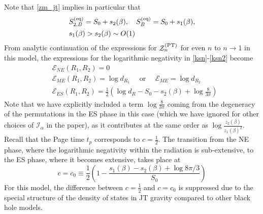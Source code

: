 \documentclass[a4paper,11pt]{article}
\newcommand\half{{\ensuremath{\frac{1}{2}}}}
\newcommand{\be}{\begin{equation}}
\newcommand{\ee}{\end{equation}}
\newcommand{\bea}{\begin{eqnarray}}
\newcommand{\eea}{\end{eqnarray}}
\newcommand\al{{\alpha}}
\def\b{{\beta}}
\newcommand\ha{{\half}}
\newcommand\sE{{\ensuremath{{\mathcal E}}}}
\newcommand\sI{{\ensuremath{{\mathcal I}}}}
\newcommand\sZ{{\mathcal Z}}
\begin{document}
\begin{enumerate}
\begin{appendix}
Note that \eqref{zm_jt} implies in particular that 
\bea 
& S_{2, B}^{(\rm eq)} = S_0 + s_2 (\b) , \quad S_{B}^{(\rm eq)} = S_0 + s_1 (\b) , \nonumber \\ & s_1 (\b) > s_2 (\b) \sim O(1) \label{jt_s}
\eea
From analytic continuation of the expressions for $\sZ_n^{\rm (PT)}$ for even $n$ to $n\rightarrow 1$ in this model, the expressions for the logarithmic negativity in \eqref{ksn}-\eqref{ksn2} become 
\begin{align}
& \sE_{NE}(R_1, R_2) = 0 \\
 & \sE_{ME}(R_1, R_2) = \log d_{R_1} \quad \text{ or } \quad \sE_{ME} = \log d_{R_2}\\
 & \sE_{ES}(R_1, R_2) = \frac{1}{2}\left(\log d_{R} - S_0 - s_2(\beta) + \log \frac{8}{3\pi}\right)
\end{align} 
Note that we have explicitly included a term $\log \frac{8}{3\pi}$ coming from the degeneracy of the permutations in the ES phase in this case (which we have ignored for other choices of $\sI_{\al}$ in the paper), as it contributes at the same order as $\log \frac{z_2(\beta)}{z_1(\beta)^2}$. Recall that the Page time $t_p$ corresponds to $c= \ha$. The transition from the NE phase, where the logarithmic negativity within the radiation is sub-extensive, to the ES phase, where it becomes extensive, takes place at 
\be 
c = c_0\equiv \frac{1}{2}\left(1- \frac{s_1(\beta)- s_2(\beta) + \log 8\pi/3}{S_0} \right)
\ee
For this model, the difference between $c= \frac{1}{2}$ and $c= c_0$ is suppressed due to the special structure of the density of states in JT gravity compared to other black hole models. 



\end{appendix}
\end{enumerate}
\end{document}
